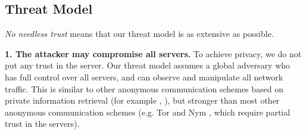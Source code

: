 \subsection{Threat Model}
\label{subsec:threatmodel}


\textit{No needless trust} means that our threat model is as extensive as possible.





\textbf{1. The attacker may compromise all servers.} To achieve privacy, we do not put any trust in the server. Our threat model assumes a global adversary who has full control over all servers, and can observe and manipulate all network traffic. This is similar to other anonymous communication schemes based on private information retrieval (for example \cite{ahmad2021addra}, ), but stronger than most other anonymous communication schemes (e.g. Tor \cite{dingledine2004tor} and Nym \cite{piotrowska2017loopix}, which require partial trust in the servers).

